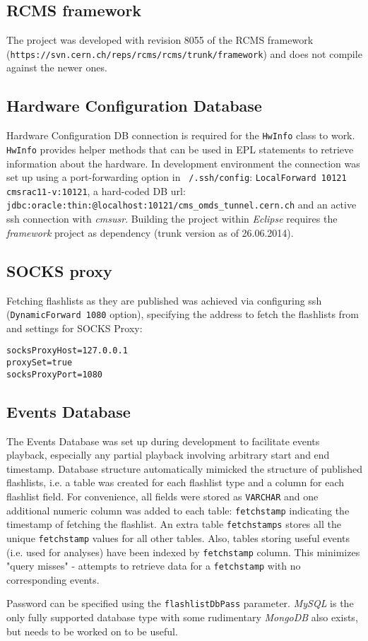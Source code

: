 \subsection{RCMS framework} \label{subsec:framework}
The project was developed with revision 8055 of the RCMS framework (\texttt{https://svn.cern.ch/reps/rcms/rcms/trunk/framework}) and does not compile against the newer ones.

\subsection{Hardware Configuration Database}
\label{subsec:hwconfdb}
Hardware Configuration DB connection is required for the \texttt{HwInfo} class to work. \texttt{HwInfo} provides helper methods that can be used in EPL statements to retrieve information about the hardware.
In development environment the connection was set up using a port-forwarding option in \texttt{~/.ssh/config}: \texttt{LocalForward 10121 cmsrac11-v:10121}, a hard-coded DB url: \texttt{jdbc:oracle:thin:@localhost:10121/cms\_omds\_tunnel.cern.ch} and an active ssh connection with \emph{cmsusr}. Building the project within \emph{Eclipse} requires the \emph{framework} project as dependency (trunk version as of 26.06.2014).

\subsection{SOCKS proxy}
\label{subsec:proxy}
Fetching flashlists as they are published was achieved via configuring ssh (\texttt{DynamicForward 1080} option), specifying the address to fetch the flashlists from and settings for SOCKS Proxy:
\begin{lstlisting}
socksProxyHost=127.0.0.1
proxySet=true
socksProxyPort=1080
\end{lstlisting}

\subsection{Events Database}
\label{subsec:eventsdb}
The Events Database was set up during development to facilitate events playback, especially any partial playback involving arbitrary start and end timestamp.
Database structure automatically mimicked the structure of published flashlists, i.e. a table was created for each flashlist type and a column for each flashlist field. 
For convenience, all fields were stored as \texttt{VARCHAR} and one additional numeric column was added to each table: \texttt{fetchstamp} indicating the timestamp of fetching the flashlist. An extra table \texttt{fetchstamps} stores all the unique \texttt{fetchstamp} values for all other tables. Also, tables storing useful events (i.e. used for analyses) have been indexed by \texttt{fetchstamp} column. This minimizes "query misses" - attempts to retrieve data for a \texttt{fetchstamp} with no corresponding events.

Password can be specified using the \texttt{flashlistDbPass} parameter. \emph{MySQL} is the only fully supported database type with some rudimentary \emph{MongoDB} also exists, but needs to be worked on to be useful.






